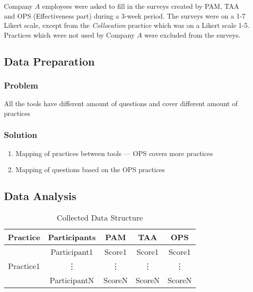 Company $A$ employees were asked to fill in the surveys created by PAM, TAA and OPS (Effectiveness part) during a 3-week period. The surveys were on a 1-7 Likert scale, except from the \textit{Collocation} practice which was on a Likert scale 1-5.
Practices which were not used by Company $A$ were excluded from the surveys.

\clearpage


\subsection{Data Preparation}

\subsubsection{Problem}
All the tools have different amount of questions and cover different amount of practices

\subsubsection{Solution}
\begin{enumerate}
	\item Mapping of practices between tools --- OPS covers more practices
	\item Mapping of questions based on the OPS practices
\end{enumerate}

\clearpage


\subsection{Data Analysis}

\begin{table} [H]
\centering
	\begin{tabular}{| c | c | c | c | c |} \hline
	\textbf{Practice} & \textbf{Participants} & \textbf{PAM} & \textbf{TAA} & \textbf{OPS} \\ \hline
	\multirow{3}{*}{Practice1} & Participant1 & Score1 & Score1 & Score1 \\ \hhline{~----}
	& \vdots & \vdots & \vdots  & \vdots \\ \hhline{~----}
	& ParticipantN & ScoreN & ScoreN & ScoreN \\ \hline
	\end{tabular}
	\caption{Collected Data Structure}
	\label{table:data_structure}
\end{table}

